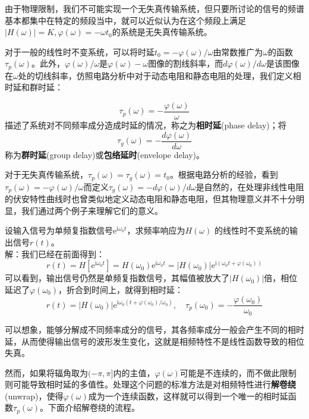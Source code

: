 由于物理限制，我们不可能实现一个无失真传输系统，但只要所讨论的信号的频谱基本都集中在特定的频段当中，就可以近似认为在这个频段上满足$\left|H(\omega)\right|=K,\varphi(\omega)=-\omega t_0$的系统是无失真传输系统。

对于一般的线性时不变系统，可以将时延$t_0=-\varphi(\omega)/\omega$由常数推广为$\omega$的函数$\tau_p(\omega)$。此外，$\varphi(\omega)/\omega$是$\varphi(\omega)-\omega$图像的割线斜率，而$d\varphi(\omega)/d\omega$是该图像在$\omega$处的切线斜率，仿照电路分析中对于动态电阻和静态电阻的处理，我们定义相时延和群时延\cite{signal_systems}：
\begin{definition}[相时延和群时延]
    \label{def:delay}
    \[\tau_p(\omega)=-\frac{\varphi(\omega)}{\omega}\]
    描述了系统对不同频率成分造成时延的情况，称之为\textbf{相时延}(phase delay)；将
    \[\tau_g(\omega)=-\frac{d\varphi(\omega)}{d\omega}\]
    称为\textbf{群时延}(group delay)或\textbf{包络延时}(envelope delay)。
\end{definition}

对于无失真传输系统，$\tau_p(\omega)=\tau_g(\omega)=t_0$。根据电路分析的经验，看到$\tau_p(\omega)=-\varphi(\omega)/\omega$而定义$\tau_g(\omega)=-d\varphi(\omega)/d\omega$是自然的，在处理非线性电阻的伏安特性曲线时也曾类似地定义动态电阻和静态电阻，但其物理意义并不十分明显，我们通过两个例子来理解它们的意义。

\begin{example}[相时延]\label{exmp:phase_delay}
设输入信号为单频复指数信号$\mathrm{e}^{\mathrm{i}\omega_0 t}$，求频率响应为$H(\omega)$
的线性时不变系统的输出信号$r(t)$。\\
解：我们已经在前面得到：\[r(t)=H\left[\mathrm{e}^{\mathrm{i}\omega_0 t}\right]=H(\omega_0)\mathrm{e}^{\mathrm{i}\omega_0 t}=\left|H(\omega_0)\right|\mathrm{e}^{\mathrm{i}(\omega_0 t+\varphi(\omega_0))}\]
可以看到，输出信号仍然是单频复指数信号，其幅值被放大了$|H(\omega_0)|$倍，相位
延迟了$\varphi(\omega_0)$，折合到时间上，就得到相时延：
$$r(t)=\left|H(\omega_0)\right|\mathrm{e}^{\mathrm{i}\omega_0 (t+\varphi(\omega_0)/\omega_0)},\quad \tau_p(\omega_0)=-\frac{\varphi(\omega_0)}{\omega_0}$$
\end{example}

可以想象，能够分解成不同频率成分的信号，其各频率成分一般会产生不同的相时延，从而使得输出信号的波形发生变化，这就是相频特性不是线性函数导致的相位失真。

然而，如果将辐角取为$(-\pi,\pi]$内的主值，$\varphi(\omega)$可能是不连续的，而不做此限制则可能导致相时延的多值性。处理这个问题的标准方法是对相频特性进行\textbf{解卷绕}(unwrap)，使得$\varphi(\omega)$成为一个连续函数，这样就可以得到一个唯一的相时延函数$\tau_p(\omega)$。下面介绍解卷绕的流程。

